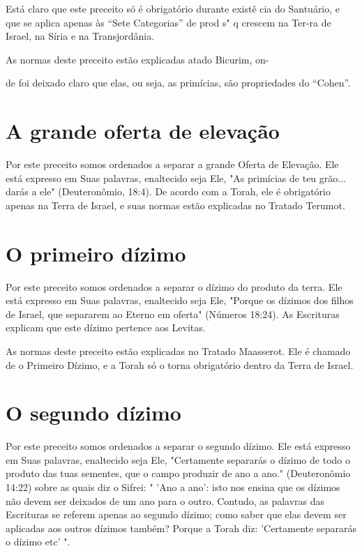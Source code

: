 Está claro que este preceito só é obrigatório durante existê cia do
Santuário, e que se aplica apenas às ``Sete Categorias'' de prod s" q
crescem na Ter-ra de Israel, na Síria e na Transjordânia.

As normas deste preceito estão explicadas atado Bicurim, on-


de foi deixado claro que elas, ou seja, as primícias, são propriedades
do ``Cohen''.


\section{A grande oferta de elevação}

Por este preceito somos ordenados a separar a grande Oferta de
Ele­vação. Ele está expresso em Suas palavras, enaltecido seja Ele, "As
primícias de teu grão... darás a ele" (Deuteronômio, 18:4). De acordo
com a Torah, ele é obrigatório apenas na Terra de Israel, e suas normas
estão explicadas no Tra­tado Terumot.

\section{O primeiro dízimo}

Por este preceito somos ordenados a separar o dízimo do produto da
terra. Ele está expresso em Suas palavras, enaltecido seja Ele, "Porque
os dízimos dos filhos de Israel, que separarem ao Eterno em oferta"
(Números 18:24). As Escrituras explicam que este dízimo pertence aos
Levitas.

As normas deste preceito estão explicadas no Tratado Maasserot. Ele é
chamado de o Primeiro Dízimo, e a Torah só o torna obrigatório dentro da
Terra de Israel.

\section{O segundo dízimo}

Por este preceito somos ordenados a separar o segundo dízimo. Ele está
expresso em Suas palavras, enaltecido seja Ele, "Certamente separarás o
dízimo de todo o produto das tuas sementes, que o campo produzir de ano
a ano." (Deuteronômio 14:22) sobre as quais diz o Sifrei: " 'Ano a ano':
isto nos ensina que os dízimos não devem ser deixados de um ano para o
outro. Contudo, as palavras das Escrituras se referem apenas ao segundo
dízimo; co­mo saber que elas devem ser aplicadas aos outros dízimos
também? Porque a Torah diz: 'Certamente separarás o dízimo etc' ".

